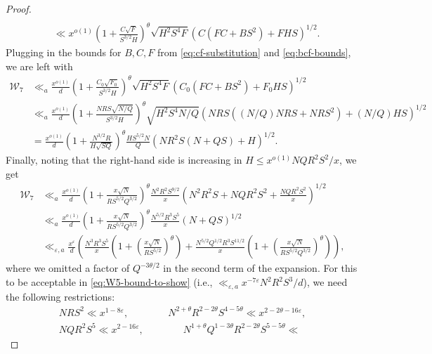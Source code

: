 \documentclass[reqno,11pt]{amsart}
\theoremstyle{remark}
\numberwithin{equation}{section}
\newcommand{\msW}{\mathscr{W}}
\newcommand{\eps}{\varepsilon}
\begin{document}
\begin{proof}
\[\begin{aligned}
    \\
    &\ll 
    x^{o(1)} 
    \left(1 + \frac{C\sqrt{F}}{S^{3/2} H}\right)^{\theta} 
    \sqrt{H^2S^4 F}
    \left(C\left(FC + BS^2\right) + FHS\right)^{1/2}.
\end{aligned}
\]
Plugging in the bounds for $B, C, F$ from \cref{eq:cf-substitution} and \cref{eq:bcf-bounds}, we are left with
\[
\begin{aligned}
    \msW_7
    &\ll_a \frac{x^{o(1)}}{d}
    \left(1 + \frac{C_0\sqrt{F_0}}{S^{3/2} H}\right)^{\theta} 
    \sqrt{H^2S^4 F}
    \left(C_0\left(FC + BS^2\right) + F_0HS\right)^{1/2}
    \\
    &\ll_a 
    \frac{x^{o(1)}}{d}
    \left(1 + \frac{NRS \sqrt{N/Q}}{S^{3/2} H}\right)^{\theta} 
    \sqrt{H^2S^4N/Q}
    \left(NRS \left((N/Q)NRS + NRS^2\right) + (N/Q)HS\right)^{1/2}
    \\
    &= 
    \frac{x^{o(1)}}{d}
    \left(1 + \frac{N^{3/2} R}{H \sqrt{SQ}}\right)^{\theta} 
    \frac{H S^{5/2} N}{Q}
    \left(NR^2S \left(N + QS\right) + H\right)^{1/2}.
\end{aligned}
\]
Finally, noting that the right-hand side is increasing in $H \le x^{o(1)} NQR^2 S^2/x$, we get
\[
\begin{aligned}
    \msW_7 
    &\ll_a \frac{x^{o(1)}}{d}
    \left(1 + \frac{x\sqrt{N}}{R S^{5/2} Q^{3/2}}\right)^{\theta} 
    \frac{N^2R^2S^{9/2}}{x}
    \left(N^2R^2S + NQR^2S^2 + \frac{NQR^2 S^2}{x}\right)^{1/2}
    \\
    &\ll_a
    \frac{x^{o(1)}}{d}
    \left(1 + \frac{x\sqrt{N}}{R S^{5/2} Q^{3/2}}\right)^{\theta} 
    \frac{N^{5/2} R^3 S^5}{x}
    \left(N + QS\right)^{1/2}
    \\
    &\ll_{\eps,a} 
    \frac{x^\eps}{d}
    \left(\frac{N^3 R^3 S^5}{x} \left(1 + \left(\frac{x\sqrt{N}}{R S^{5/2}} \right)^{\theta}\right) + \frac{N^{5/2} Q^{1/2} R^3 S^{11/2}}{x} \left(1 + \left(\frac{x\sqrt{N}}{R S^{5/2} Q^{3/2}} \right)^{\theta}\right)\right),
\end{aligned}
\]
where we omitted a factor of $Q^{-3\theta/2}$ in the second term of the expansion.
For this to be acceptable in \cref{eq:W5-bound-to-show} (i.e., $\ll_{\eps,a} x^{-7\eps} N^2 R^2 S^3 / d$), we need the following restrictions:
\[
\begin{gathered}
    N R S^2 \ll x^{1-8\eps},
    \qquad\qquad
    N^{2+\theta} R^{2-2\theta} S^{4-5\theta}
    \ll 
    x^{2-2\theta-16\eps},
    \\
    N Q R^2 S^5 \ll x^{2-16\eps},
    \qquad\qquad 
    N^{1+\theta} Q^{1-3\theta} R^{2-2\theta} S^{5-5\theta} \ll 

\end{gathered}\]
\end{proof}
\end{document}
